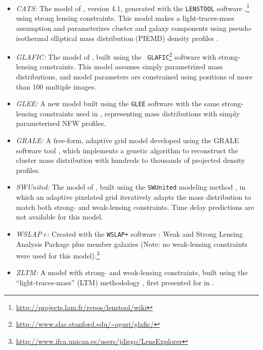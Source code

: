 \bigskip
\begin{itemize}
\item{{\it CATS:} The model of \citet{Jauzac:2014}, version 4.1, generated with
  the {\tt LENSTOOL} software
  \citep{Jullo:2007},\footnote{\url{http://projects.lam.fr/repos/lenstool/wiki}}}
  using strong lensing constraints.  This model makes a
  light-traces-mass assumption and parameterizes cluster and galaxy components
  using pseudo-isothermal elliptical mass distribution (PIEMD) density profiles
  \citep{Eliasdottir:2007, Limousin:2007}. 
\item{\it GLAFIC:} The model of \citet{Kawamata:2016}, built using the
  {\tt
    GLAFIC}\footnote{\url{http://www.slac.stanford.edu/~oguri/glafic/}}
  software \citep{Oguri:2010b} with strong-lensing constraints. This
  model assumes simply parametrized mass distributions, and model
  parameters are constrained using positions of more than 100 multiple
  images.
\item{\it GLEE:} A new model built using the {\tt GLEE} software
  \citep{Suyu:2010b, Suyu:2012} with the same strong-lensing
  constraints used in \citet{Caminha:2017}, representing mass
  distributions with simply parameterized NFW profiles. 
\item{{\it GRALE:} A free-form, adaptive grid model developed using
  the GRALE software tool \citep{Liesenborgs:2006, Liesenborgs:2007,
    Mohammed:2014, Sebesta:2016}, which implements a genetic algorithm
  to reconstruct the cluster mass distribution with hundreds to
  thousands of projected \citet{Plummer:1911} density profiles.}
\item{\it SWUnited:} The model of \citet{Hoag:2016}, built using the
  {\tt SWUnited} modeling method \citep{Bradac:2005, Bradac:2009}, in
  which an adaptive pixelated grid iteratively adapts the mass
  distribution to match both strong- and weak-lensing constraints.
  Time delay predictions are not available for this model.
\item{\it WSLAP+:} Created with the {\tt WSLAP+} software
  \citep{Sendra:2014}: Weak and Strong Lensing Analysis Package plus
  member galaxies (Note: no weak-lensing constraints were used for
  this 
  model).\footnote{\url{http://www.ifca.unican.es/users/jdiego/LensExplorer}}
\item{{\it ZLTM:} A model with strong- and weak-lensing constraints,
  built using the ``light-traces-mass'' (LTM) methodology
  \citep{Zitrin:2009a,Zitrin:2015}, first presented for  in
  \citet{Zitrin:2013a}.}
\end{itemize}
\bigskip    

